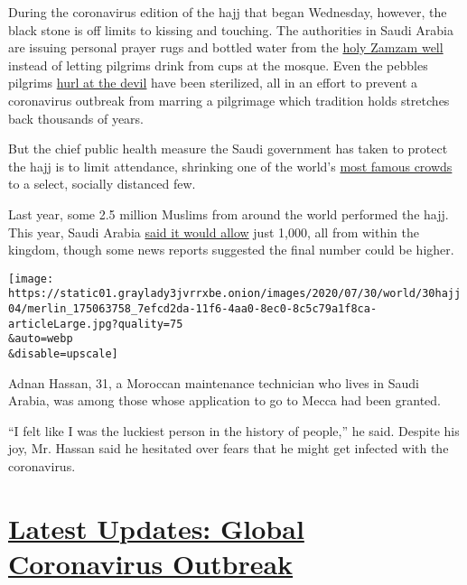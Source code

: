 During the coronavirus edition of the hajj that began Wednesday,
however, the black stone is off limits to kissing and touching. The
authorities in Saudi Arabia are issuing personal prayer rugs and bottled
water from the
\href{https://english.alarabiya.net/en/News/gulf/2018/08/16/Hajj-pilgrims-consume-8-mln-liters-of-Zamzam-water}{holy
Zamzam well} instead of letting pilgrims drink from cups at the mosque.
Even the pebbles pilgrims
\href{https://www.reuters.com/article/us-saudi-haj/muslim-pilgrims-converge-on-jamarat-for-ritual-stoning-of-the-devil-idUSKCN1V109D}{hurl
at the devil} have been sterilized, all in an effort to prevent a
coronavirus outbreak from marring a pilgrimage which tradition holds
stretches back thousands of years.

But the chief public health measure the Saudi government has taken to
protect the hajj is to limit attendance, shrinking one of the world's
\href{https://www.nytimes3xbfgragh.onion/interactive/2018/08/23/world/middleeast/hajj-attendance-expansion.html?action=click\&module=RelatedLinks\&pgtype=Article}{most
famous crowds} to a select, socially distanced few.

Last year, some 2.5 million Muslims from around the world performed the
hajj. This year, Saudi Arabia
\href{https://www.nytimes3xbfgragh.onion/2020/06/23/world/middleeast/hajj-pilgrimage-canceled.html}{said
it would allow} just 1,000, all from within the kingdom, though some
news reports suggested the final number could be higher.

\texttt{[image: https://static01.graylady3jvrrxbe.onion/images/2020/07/30/world/30hajj04/merlin\_175063758\_7efcd2da-11f6-4aa0-8ec0-8c5c79a1f8ca-articleLarge.jpg?quality=75\\\&auto=webp\\\&disable=upscale]}

Adnan Hassan, 31, a Moroccan maintenance technician who lives in Saudi
Arabia, was among those whose application to go to Mecca had been
granted.

``I felt like I was the luckiest person in the history of people,'' he
said. Despite his joy, Mr. Hassan said he hesitated over fears that he
might get infected with the coronavirus.

\hypertarget{latest-updates-global-coronavirus-outbreak}{%
\section{\texorpdfstring{\href{https://www.nytimes3xbfgragh.onion/2020/08/01/world/coronavirus-covid-19.html?action=click\&pgtype=Article\&state=default\&region=MAIN_CONTENT_1\&context=storylines_live_updates}{Latest
Updates: Global Coronavirus
Outbreak}}{Latest Updates: Global Coronavirus Outbreak}}\label{latest-updates-global-coronavirus-outbreak}}

